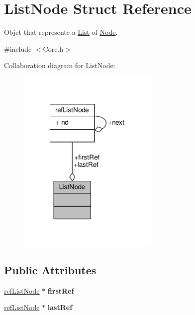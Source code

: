 \hypertarget{structListNode}{\section{List\-Node Struct Reference}
\label{structListNode}
}


Objet that represente a \hyperlink{structList}{List} of \hyperlink{structNode}{Node}.  




{\ttfamily \#include $<$Core.\-h$>$}



Collaboration diagram for List\-Node\-:
\nopagebreak
\begin{figure}[H]
\begin{center}
\leavevmode
\includegraphics[width=192pt]{structListNode__coll__graph}
\end{center}
\end{figure}
\subsection*{Public Attributes}
\begin{DoxyCompactItemize}
\item 
\hypertarget{structListNode_a4264652974ed589c9ed582f3a4824601}{\hyperlink{structrefListNode}{ref\-List\-Node} $\ast$ {\bfseries first\-Ref}}\label{structListNode_a4264652974ed589c9ed582f3a4824601}

\item 
\hypertarget{structListNode_a014039589e69b8826362231855e4d96d}{\hyperlink{structrefListNode}{ref\-List\-Node} $\ast$ {\bfseries last\-Ref}}\label{structListNode_a014039589e69b8826362231855e4d96d}

\end{DoxyCompactItemize}


